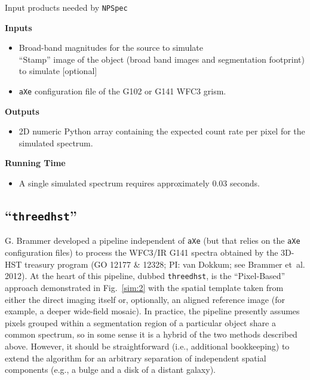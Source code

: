 \documentclass[preprint]{aastex}
\begin{document}
\centerline{Input products needed by \texttt{NPSpec}}
\noindent \textbf{Inputs}
\begin{itemize}
\item Broad-band magnitudes for the source to simulate\\
``Stamp'' image of the object (broad band images and segmentation footprint) to simulate [optional]\\
\item \texttt{aXe} configuration file of the G102 or G141 WFC3 grism.
\end{itemize}
\noindent \textbf{Outputs}
\begin{itemize}
\item 2D numeric Python array containing the expected count rate per pixel for the simulated spectrum.
\end{itemize}
\noindent \textbf{Running Time}
\begin{itemize}
\item A single simulated spectrum requires approximately 0.03 seconds.
\end{itemize}

\subsection{``\texttt{threedhst}''}

G. Brammer developed a pipeline independent of \texttt{aXe} (but that relies on the \texttt{aXe} configuration files)  to process the WFC3/IR G141 spectra obtained by the 3D-HST treasury program (GO 12177 \& 12328; PI: van Dokkum; see Brammer et~al. 2012).  At the heart of this pipeline, dubbed \texttt{threedhst}, is the ``Pixel-Based'' approach demonstrated in Fig.~\ref{sim:2} with the spatial template taken from either the direct imaging itself or, optionally, an aligned reference image (for example, a deeper wide-field mosaic).  In practice, the pipeline presently assumes pixels grouped within a segmentation region of a particular object share a common spectrum, so in some sense it is a hybrid of the two methods described above.  However, it should be straightforward (i.e., additional bookkeeping) to extend the algorithm for an arbitrary separation of independent spatial components (e.g., a bulge and a disk of a distant galaxy).
\end{document}
